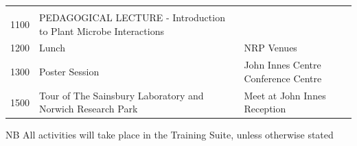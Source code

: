 \documentclass[12pt,]{book}
\theoremstyle{definition}
\theoremstyle{definition}
\theoremstyle{remark}
\begin{document}
\begin{longtable}[]{@{}lll@{}}
\begin{minipage}[t]{0.38\columnwidth}
\end{minipage} & \begin{minipage}[t]{0.38\columnwidth}\raggedright\strut
\strut
\end{minipage}\tabularnewline
\begin{minipage}[t]{0.09\columnwidth}\raggedright\strut
1100\strut
\end{minipage} & \begin{minipage}[t]{0.38\columnwidth}\raggedright\strut
PEDAGOGICAL LECTURE - Introduction to Plant Microbe Interactions\strut
\end{minipage} & \begin{minipage}[t]{0.38\columnwidth}\raggedright\strut
\strut
\end{minipage}\tabularnewline
\begin{minipage}[t]{0.09\columnwidth}\raggedright\strut
1200\strut
\end{minipage} & \begin{minipage}[t]{0.38\columnwidth}\raggedright\strut
Lunch\strut
\end{minipage} & \begin{minipage}[t]{0.38\columnwidth}\raggedright\strut
NRP Venues\strut
\end{minipage}\tabularnewline
\begin{minipage}[t]{0.09\columnwidth}\raggedright\strut
1300\strut
\end{minipage} & \begin{minipage}[t]{0.38\columnwidth}\raggedright\strut
Poster Session\strut
\end{minipage} & \begin{minipage}[t]{0.38\columnwidth}\raggedright\strut
John Innes Centre Conference Centre\strut
\end{minipage}\tabularnewline
\begin{minipage}[t]{0.09\columnwidth}\raggedright\strut
1500\strut
\end{minipage} & \begin{minipage}[t]{0.38\columnwidth}\raggedright\strut
Tour of The Sainsbury Laboratory and Norwich Research Park\strut
\end{minipage} & \begin{minipage}[t]{0.38\columnwidth}\raggedright\strut
Meet at John Innes Reception\strut
\end{minipage}\tabularnewline
\bottomrule
\end{longtable}

NB All activities will take place in the Training Suite, unless
otherwise stated
\end{document}

